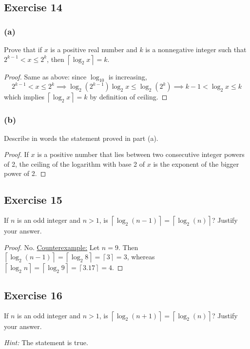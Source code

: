 \documentclass[14pt]{extarticle}
\newcommand{\ceil}[1]{{\left\lceil#1\right\rceil}}
\begin{document}
\subsection{Exercise 14}
\subsubsection{(a)}
Prove that if \(x\) is a positive real number and \(k\) is a nonnegative integer such that \(2^{k-1} < x \leq 2^k\), then 
\(\ceil{\log_2 x} = k\).

\begin{proof}
Same as above: since \(\log_{10}\) is increasing,
\[
2^{k-1} < x \leq 2^k \implies \log_{2}(2^{k-1}) \log_2 x \leq  \log_2(2^k) \implies k-1 < \log_2 x \leq k
\]
which implies \(\ceil{\log_2 x} = k\) by definition of ceiling.
\end{proof}

\subsubsection{(b)}
Describe in words the statement proved in part (a).

\begin{proof}
If \(x\) is a positive number that lies between two consecutive integer powers of 2, the ceiling of the logarithm with base 2 of \(x\) is the exponent of the bigger power of 2. 
\end{proof}

\subsection{Exercise 15}
If \(n\) is an odd integer and \(n > 1\), is \(\ceil{\log_2(n - 1)} = \ceil{\log_2(n)}\)? Justify your answer.

\begin{proof}
No. \underline{Counterexample:} Let \(n = 9\). Then \(\ceil{\log_2 (n - 1)} =  \ceil{\log_2 8} = \ceil{3} = 3\), 
whereas \(\ceil{\log_2 n} = \ceil{\log_2 9} = \ceil{3.17} = 4\).
\end{proof}

\subsection{Exercise 16}
If \(n\) is an odd integer and \(n > 1\), is \(\ceil{\log_2(n + 1)} = \ceil{\log_2(n)}\)? Justify your answer.

{\it Hint:} The statement is true.
\end{document}
